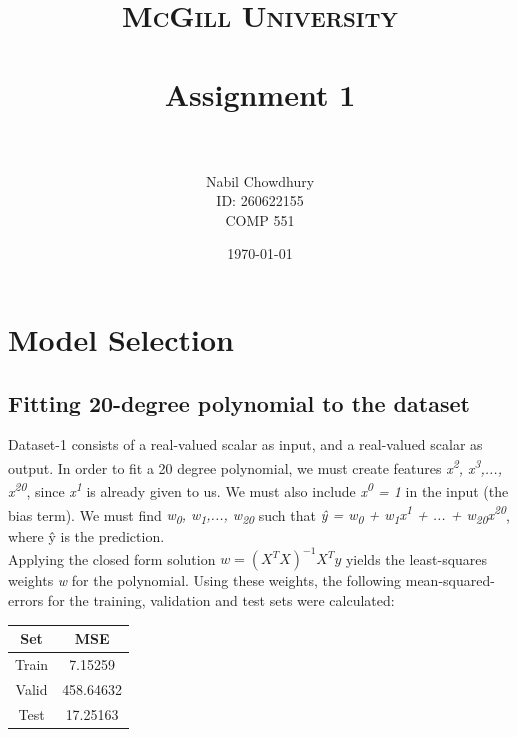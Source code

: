 \documentclass[paper=a4, fontsize=11pt]{scrartcl} %
\title{
\normalfont \normalsize
\textsc{McGill University} \\ [25pt] %
\horrule{0.5pt} \\[0.4cm] %
\huge Assignment 1 \\ %
\horrule{2pt} \\[0.5cm] %
}
\author{
    Nabil Chowdhury \\
    \small{ID: 260622155} \\
    \small{COMP 551}
} %
\date{\normalsize\today} %
\numberwithin{equation}{section} %
\numberwithin{figure}{section} %
\numberwithin{table}{section} %
\begin{document}
\maketitle %


\section{Model Selection}
\subsection{Fitting 20-degree polynomial to the dataset}
Dataset-1 consists of a real-valued scalar as input, and a real-valued scalar as output. In order to fit a 20 degree polynomial, we must create features \textit{x\textsuperscript{2}, x\textsuperscript{3},..., x\textsuperscript{20}}, since \textit{x\textsuperscript{1}} is already given to us. We must also include \textit{x\textsuperscript{0} = 1} in the input (the bias term). We must find \textit{w\textsubscript{0}, w\textsubscript{1},..., w\textsubscript{20}} such that \textit{\^{y} = w\textsubscript{0} + w\textsubscript{1}x\textsuperscript{1} + ... + w\textsubscript{20}x\textsuperscript{20}}, where \^{y} is the prediction. \\

Applying the closed form solution  \(w = (X^TX)^{-1}X^Ty\) yields the least-squares weights \textit{w} for the polynomial. Using these weights, the following mean-squared-errors for the training, validation and test sets were calculated:

\begin{center}
\begin{tabular}{ |c|c| }
	\hline
	\textbf{Set} & \textbf{MSE} \\
	\hline
	Train & 7.15259 \\
	Valid & 458.64632 \\
	Test & 17.25163 \\
	\hline
\end{tabular}
\end{center}
\end{document}
